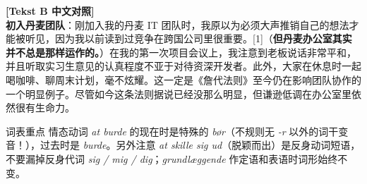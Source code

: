 \begin{transbox}
\small
\textbf{\color{NCDTeal}[Tekst B 中文对照]}\\
\textbf{初入丹麦团队}：刚加入我的丹麦 IT 团队时，我原以为必须大声推销自己的想法才能被听见，因为我以前读到过竞争在跨国公司里很重要。[1]（\textbf{但丹麦办公室其实并不总是那样运作的。}）在我的第一次项目会议上，我注意到老板说话非常平和，并且听取实习生意见的认真程度不亚于对待资深开发者。此外，大家在休息时一起喝咖啡、聊周末计划，毫不炫耀。这一定是《詹代法则》至今仍在影响团队协作的一个明显例子。尽管如今这条法则据说已经没那么明显，但谦逊低调在办公室里依然很有生命力。
\end{transbox}


\begin{tipbox}{词表重点}
情态动词 \textit{at burde} 的现在时是特殊的 \textit{bør}（不规则无 \textit{-r} 以外的词干变音！），过去时是 \textit{burde}。另外注意 \textit{at skille sig ud}（脱颖而出）是反身动词短语，不要漏掉反身代词 \textit{sig / mig / dig}；\textit{grundlæggende} 作定语和表语时词形始终不变。
\end{tipbox}

